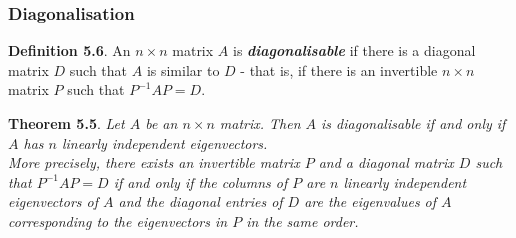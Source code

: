 \documentclass[
  letterpaper,
  DIV=11,
  numbers=noendperiod]{scrartcl}
\theoremstyle{remark}
\begin{document}
\subsubsection{Diagonalisation}\label{diagonalisation}

\textbf{Definition 5.6}. An \(n \times n\) matrix \(A\) is
\textbf{\emph{diagonalisable}} if there is a diagonal matrix \(D\) such
that \(A\) is similar to \(D\) - that is, if there is an invertible
\(n \times n\) matrix \(P\) such that \(P^{-1}AP = D\).

\textbf{Theorem 5.5}. \emph{Let \(A\) be an \(n \times n\) matrix. Then
\(A\) is diagonalisable if and only if \(A\) has \(n\) linearly
independent eigenvectors.\\
More precisely, there exists an invertible matrix \(P\) and a diagonal
matrix \(D\) such that \(P^{-1}AP = D\) if and only if the columns of
\(P\) are \(n\) linearly independent eigenvectors of \(A\) and the
diagonal entries of \(D\) are the eigenvalues of \(A\) corresponding to
the eigenvectors in \(P\) in the same order.}
\end{document}
